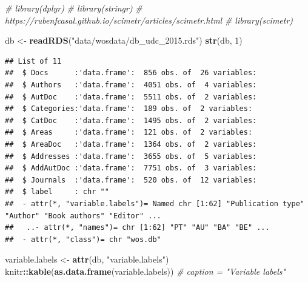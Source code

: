 \documentclass[
]{book}
\newenvironment{Shaded}{\begin{snugshade}}{\end{snugshade}}
\newcommand{\CommentTok}[1]{\textcolor[rgb]{0.56,0.35,0.01}{\textit{#1}}}
\newcommand{\DecValTok}[1]{\textcolor[rgb]{0.00,0.00,0.81}{#1}}
\newcommand{\FunctionTok}[1]{\textcolor[rgb]{0.13,0.29,0.53}{\textbf{#1}}}
\newcommand{\NormalTok}[1]{#1}
\newcommand{\OtherTok}[1]{\textcolor[rgb]{0.56,0.35,0.01}{#1}}
\newcommand{\SpecialCharTok}[1]{\textcolor[rgb]{0.81,0.36,0.00}{\textbf{#1}}}
\newcommand{\StringTok}[1]{\textcolor[rgb]{0.31,0.60,0.02}{#1}}
\begin{document}
\begin{Shaded}
\begin{Highlighting}[]
\CommentTok{\# library(dplyr)}
\CommentTok{\# library(stringr)}
\CommentTok{\# https://rubenfcasal.github.io/scimetr/articles/scimetr.html}
\CommentTok{\# library(scimetr)}

\NormalTok{db }\OtherTok{\textless{}{-}} \FunctionTok{readRDS}\NormalTok{(}\StringTok{"data/wosdata/db\_udc\_2015.rds"}\NormalTok{)}
\FunctionTok{str}\NormalTok{(db, }\DecValTok{1}\NormalTok{)}
\end{Highlighting}
\end{Shaded}

\begin{verbatim}
## List of 11
##  $ Docs      :'data.frame':  856 obs. of  26 variables:
##  $ Authors   :'data.frame':  4051 obs. of  4 variables:
##  $ AutDoc    :'data.frame':  5511 obs. of  2 variables:
##  $ Categories:'data.frame':  189 obs. of  2 variables:
##  $ CatDoc    :'data.frame':  1495 obs. of  2 variables:
##  $ Areas     :'data.frame':  121 obs. of  2 variables:
##  $ AreaDoc   :'data.frame':  1364 obs. of  2 variables:
##  $ Addresses :'data.frame':  3655 obs. of  5 variables:
##  $ AddAutDoc :'data.frame':  7751 obs. of  3 variables:
##  $ Journals  :'data.frame':  520 obs. of  12 variables:
##  $ label     : chr ""
##  - attr(*, "variable.labels")= Named chr [1:62] "Publication type" "Author" "Book authors" "Editor" ...
##   ..- attr(*, "names")= chr [1:62] "PT" "AU" "BA" "BE" ...
##  - attr(*, "class")= chr "wos.db"
\end{verbatim}

\begin{Shaded}
\begin{Highlighting}[]
\NormalTok{variable.labels }\OtherTok{\textless{}{-}} \FunctionTok{attr}\NormalTok{(db, }\StringTok{"variable.labels"}\NormalTok{)}
\NormalTok{knitr}\SpecialCharTok{::}\FunctionTok{kable}\NormalTok{(}\FunctionTok{as.data.frame}\NormalTok{(variable.labels)) }\CommentTok{\# caption = "Variable labels"}
\end{Highlighting}
\end{Shaded}
\end{document}

